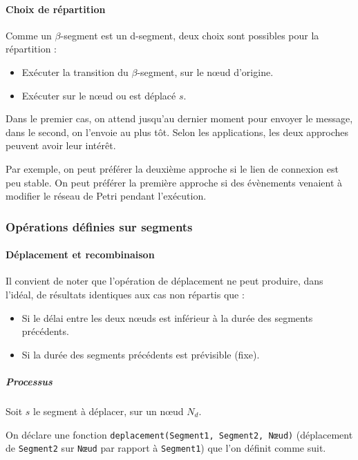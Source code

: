 \paragraph{Choix de répartition}
Comme un $\beta$-segment est un d-segment, deux choix sont possibles pour la répartition : 

\begin{itemize}
	\item Exécuter la transition du $\beta$-segment, sur le nœud d'origine.
	\item Exécuter sur le nœud ou est déplacé $s$.
\end{itemize}

Dans le premier cas, on attend jusqu'au dernier moment pour envoyer le message, dans le second, on l'envoie au plus tôt. Selon les applications, les deux approches peuvent avoir leur intérêt.

Par exemple, on peut préférer la deuxième approche si le lien de connexion est peu stable. On peut préférer la première approche si des évènements venaient à modifier le réseau de Petri pendant l'exécution.

\subsubsection{Opérations définies sur segments}
\paragraph{Déplacement et recombinaison}

Il convient de noter que l'opération de déplacement ne peut produire, dans l'idéal, de résultats identiques aux cas non répartis que : 
\begin{itemize}
\item Si le délai entre les deux nœuds est inférieur à la durée des segments précédents.
\item Si la durée des segments précédents est prévisible (fixe).
\end{itemize} 

\subparagraph{Processus}
Soit $s$ le segment à déplacer, sur un nœud $N_d$.

On déclare une fonction \texttt{deplacement(Segment1, Segment2, Nœud)} (déplacement de \texttt{Segment2} sur \texttt{Nœud} par rapport à \texttt{Segment1}) que l'on définit comme suit.

